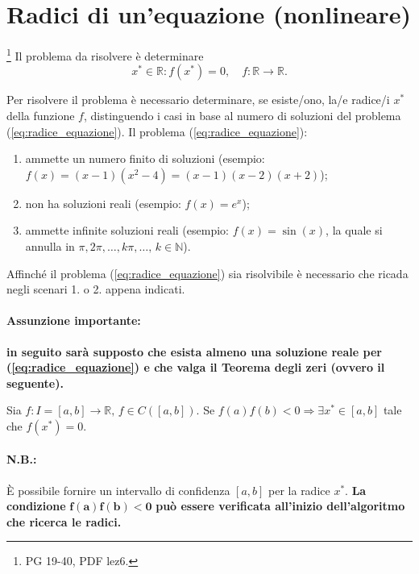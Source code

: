 \section{Radici di un'equazione (nonlineare)}
\footnote{PG 19-40, PDF lez6.} Il problema da risolvere è determinare
\begin{equation} \label{eq:radice_equazione}
	x^*\in \mathbb R : f(x^*)=0,\quad f:\mathbb R\rightarrow \mathbb R.
\end{equation}

Per risolvere il problema è necessario determinare, se esiste/ono, la/e radice/i $x^*$ della funzione $f$, distinguendo i casi in base al numero di soluzioni del problema (\ref{eq:radice_equazione}). Il problema (\ref{eq:radice_equazione}):
\begin{enumerate} 
	\item ammette un numero finito di soluzioni (esempio: $f(x)=(x-1)(x^2-4)=(x-1)(x-2)(x+2)$);
	\item non ha soluzioni reali (esempio: $f(x)=e^x$);
	\item ammette infinite soluzioni reali (esempio: $f(x)=\sin(x)$, la quale si annulla in $\pi, 2\pi, \dots, k\pi, \dots,\, k\in\mathbb N$).
\end{enumerate}
Affinché il problema (\ref{eq:radice_equazione}) sia risolvibile è necessario che ricada negli scenari 1. o 2. appena indicati.

\paragraph{Assunzione importante:} \textbf{in seguito sarà supposto che esista almeno una soluzione reale per (\ref{eq:radice_equazione}) e che valga il Teorema degli zeri (ovvero il seguente).} 

\begin{theorem}
	Sia $f\colon I=[a,b]\rightarrow\mathbb R,\, f\in C([a,b])$. Se $f(a)f(b)< 0 \Rightarrow\exists x^* \in [a,b]$ tale che $f(x^*)=0$.
\end{theorem}
\paragraph{N.B.:} È possibile fornire un intervallo di confidenza $[a,b]$ per la radice $x^*$. \textbf{La condizione} $\boldsymbol{f(a)f(b) < 0}$ \textbf{può essere verificata all'inizio dell'algoritmo che ricerca le radici.}

\addtocounter{footnote}{-1}

